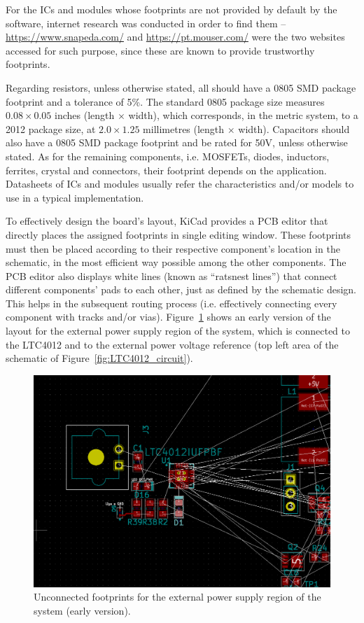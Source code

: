 For the ICs and modules whose footprints are not provided by default by the software, internet research was conducted in order to find them -- \url{https://www.snapeda.com/} and \url{https://pt.mouser.com/} were the two websites accessed for such purpose, since these are known to provide trustworthy footprints.

Regarding resistors, unless otherwise stated, all should have a 0805 \gls{SMD} package footprint and a tolerance of 5\%. The standard 0805 package size measures $0.08 \times 0.05$ inches (length $\times$ width), which corresponds, in the metric system, to a 2012 package size, at $2.0 \times 1.25$ millimetres (length $\times$ width).
Capacitors should also have a 0805 SMD package footprint and be rated for 50V, unless otherwise stated.
As for the remaining components, i.e. MOSFETs, diodes, inductors, ferrites, crystal and connectors, their footprint depends on the application.
Datasheets of ICs and modules usually refer the characteristics and/or models to use in a typical implementation.

To effectively design the board's layout, KiCad provides a PCB editor that directly places the assigned footprints in single editing window. These footprints must then be placed according to their respective component's location in the schematic, in the most efficient way possible among the other components. The PCB editor also displays white lines (known as ``ratsnest lines'') that connect different components' pads to each other, just as defined by the schematic design. This helps in the subsequent routing process (i.e. effectively connecting every component with tracks and/or vias). Figure~\ref{fig:ratsnest} shows an early version of the layout for the external power supply region of the system, which is connected to the LTC4012 and to the external power voltage reference (top left area of the schematic of Figure~\ref{fig:LTC4012_circuit}).

\begin{figure}[h]
	\centering
	\includegraphics[width=1.0\textwidth]{Chapters/Figures/chapter5/ratsnest.png}
	\caption{Unconnected footprints for the external power supply region of the system (early version).}
	\label{fig:ratsnest}
\end{figure}

